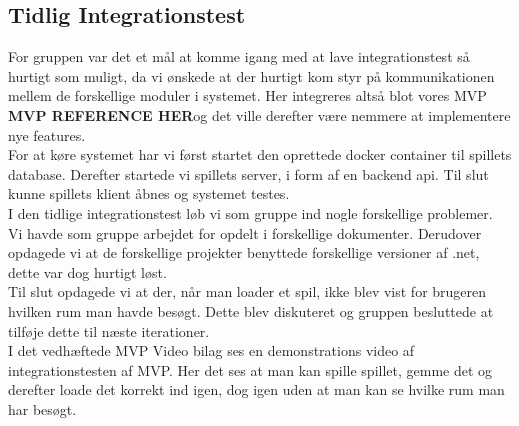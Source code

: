 \subsection{Tidlig Integrationstest}
For gruppen var det et mål at komme igang med at lave integrationstest så hurtigt som muligt, da vi ønskede at der hurtigt kom styr på kommunikationen mellem de forskellige moduler i systemet. Her integreres altså blot vores MVP \textbf{MVP REFERENCE HER}og det ville derefter være nemmere at implementere nye features.\\

\noindent For at køre systemet har vi først startet den oprettede docker container til spillets database. Derefter startede vi spillets server, i form af en backend api. Til slut kunne spillets klient åbnes og systemet testes.\\

\noindent I den tidlige integrationstest løb vi som gruppe ind nogle forskellige problemer.\\
Vi havde som gruppe arbejdet for opdelt i forskellige dokumenter. 
Derudover opdagede vi at de forskellige projekter benyttede forskellige versioner af .net, dette var dog hurtigt løst.\\
Til slut opdagede vi at der, når man loader et spil, ikke blev vist for brugeren hvilken rum man havde besøgt. Dette blev diskuteret og gruppen besluttede at tilføje dette til næste iterationer.\\

\noindent I det vedhæftede MVP Video bilag ses en demonstrations video af integrationstesten af MVP. Her det ses at man kan spille spillet, gemme det og derefter loade det korrekt ind igen, dog igen uden at man kan se hvilke rum man har besøgt.
